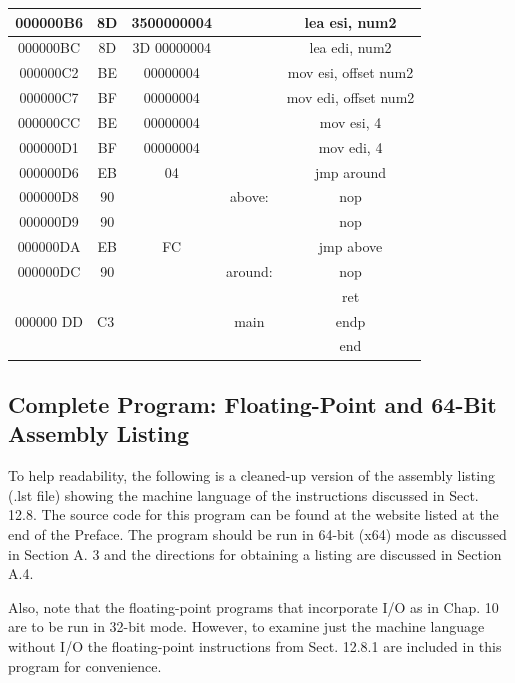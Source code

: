 \documentclass[10pt]{book}
\begin{document}
\begin{center}
\begin{tabular}{|c|c|c|c|c|}
\hline
000000B6 & 8D & 3500000004 &  & lea esi, num2 \\
\hline
000000BC & 8D & 3D 00000004 &  & lea edi, num2 \\
\hline
000000C2 & BE & 00000004 &  & mov esi, offset num2 \\
\hline
000000C7 & BF & 00000004 &  & mov edi, offset num2 \\
\hline
000000CC & BE & 00000004 &  & mov esi, 4 \\
\hline
000000D1 & BF & 00000004 &  & mov edi, 4 \\
\hline
000000D6 & EB & 04 &  & jmp around \\
\hline
000000D8 & 90 &  & above: & nop \\
\hline
000000D9 & 90 &  &  & nop \\
\hline
000000DA & EB & FC &  & jmp above \\
\hline
000000DC & 90 &  & around: & nop \\
\hline
\multirow[t]{3}{*}{000000 DD} & \multicolumn{2}{|l|}{\multirow[t]{3}{*}{C3}} &  & ret \\
\hline
 &  &  & main & endp \\
\hline
 &  &  &  & end \\
\hline
\end{tabular}
\end{center}

\subsection{Complete Program: Floating-Point and 64-Bit Assembly Listing}
To help readability, the following is a cleaned-up version of the assembly listing (.lst file) showing the machine language of the instructions discussed in Sect. 12.8. The source code for this program can be found at the website listed at the end of the Preface. The program should be run in 64-bit (x64) mode as discussed in Section A. 3 and the directions for obtaining a listing are discussed in Section A.4.


Also, note that the floating-point programs that incorporate I/O as in Chap. 10 are to be run in 32-bit mode. However, to examine just the machine language without I/O the floating-point instructions from Sect. 12.8.1 are included in this program for convenience.
\end{document}
